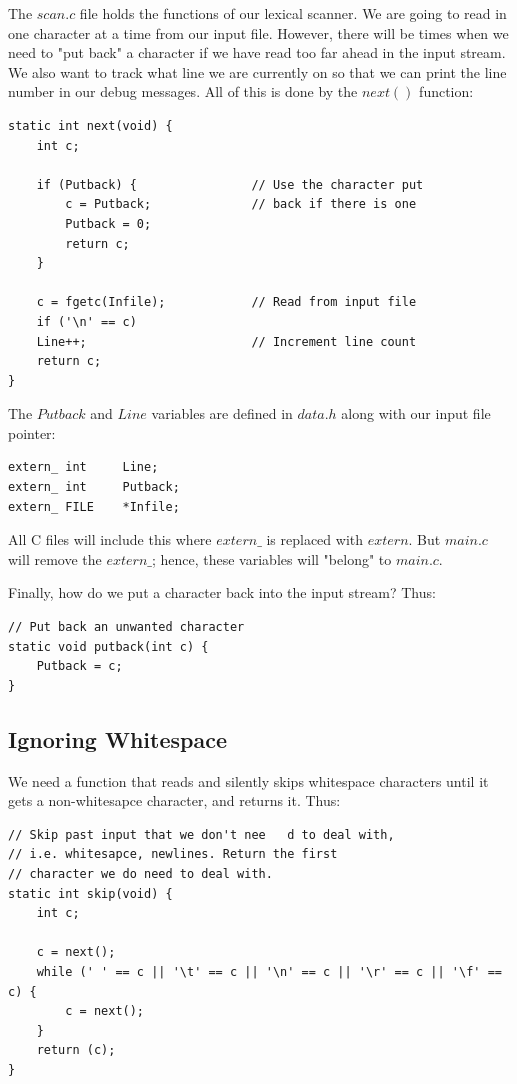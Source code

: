 \documentclass[a4paper,12pt]{article}
\begin{document}
The $scan.c$ file holds the functions of our lexical scanner. We are going to read in one character at a time from our input file. However, there will be times when we need to "put back" a character if we have read too far ahead in the input stream. We also want to track what line we are currently on so that we can print the line number in our debug messages. All of this is done by the $next()$ function:

\begin{lstlisting}
static int next(void) {
    int c;

    if (Putback) {                // Use the character put
        c = Putback;              // back if there is one
        Putback = 0;
        return c;
    }

    c = fgetc(Infile);            // Read from input file
    if ('\n' == c)
    Line++;                       // Increment line count
    return c;
}
\end{lstlisting}

The $Putback$ and $Line$ variables are defined in $data.h$ along with our input file pointer:

\begin{lstlisting}
extern_ int     Line;
extern_ int     Putback;
extern_ FILE    *Infile;
\end{lstlisting}

All C files will include this where $extern\_$ is replaced with $extern$. But $main.c$ will remove the $extern\_$; hence, these variables will "belong" to $main.c$.

Finally, how do we put a character back into the input stream? Thus:

\begin{lstlisting}
// Put back an unwanted character
static void putback(int c) {
    Putback = c;
}
\end{lstlisting}

\subsection{Ignoring Whitespace}

We need a function that reads and silently skips whitespace characters until it gets a non-whitesapce character, and returns it. Thus:

\begin{lstlisting}
// Skip past input that we don't nee   d to deal with,
// i.e. whitesapce, newlines. Return the first
// character we do need to deal with.
static int skip(void) {
    int c;

    c = next();
    while (' ' == c || '\t' == c || '\n' == c || '\r' == c || '\f' == c) {
        c = next();
    }
    return (c);
}
\end{lstlisting}
\end{document}
